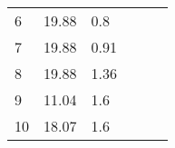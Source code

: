 \documentclass[oneside,onecolumn]{article}
\begin{document}
\begin{table}[]
\begin{tabular}{llllll}
6                                                                                   & 19.88                                                                                                   & 0.8                                                                                    &                                                                                      &                                                                                                         &                                                                                        \\
7                                                                                   & 19.88                                                                                                   & 0.91                                                                                   &                                                                                      &                                                                                                         &                                                                                        \\
8                                                                                   & 19.88                                                                                                   & 1.36                                                                                   &                                                                                      &                                                                                                         &                                                                                        \\
9                                                                                   & 11.04                                                                                                   & 1.6                                                                                    &                                                                                      &                                                                                                         &                                                                                        \\
10                                                                                  & 18.07                                                                                                   & 1.6                                                                                    &                                                                                      &                                                                                                         &                                                                                        \\

\end{tabular}
\end{table}
\end{document}
